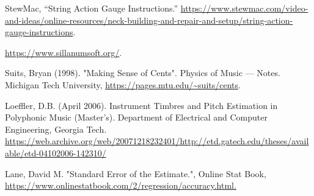 \begin{thebibliography}{15}
     StewMac, “String Action Gauge Instructions.” \url{https://www.stewmac.com/video-and-ideas/online-resources/neck-building-and-repair-and-setup/string-action-gauge-instructions}.

     \url{https://www.sillanumsoft.org/}.

     Suits, Bryan (1998). "Making Sense of Cents". Physics of Music — Notes. Michigan Tech University, \url{https://pages.mtu.edu/~suits/cents}.

     Loeffler, D.B. (April 2006). Instrument Timbres and Pitch Estimation in Polyphonic Music (Master's). Department of Electrical and Computer Engineering, Georgia Tech. \url{https://web.archive.org/web/20071218232401/http://etd.gatech.edu/theses/available/etd-04102006-142310/}

     Lane, David M. "Standard Error of the Estimate.", Online Stat Book, \url{https://www.onlinestatbook.com/2/regression/accuracy.html.}

\end{thebibliography}
